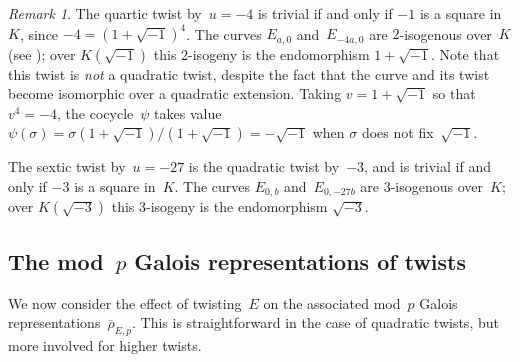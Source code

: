 \documentclass[12pt, reqno]{amsart}
\newcommand{\rhobar}{{\overline{\rho}}}
\numberwithin{equation}{section}
\theoremstyle{definition}
\theoremstyle{remark}
\newtheorem{remark}[theorem]{Remark}
\begin{document}
\begin{remark}\label{R:2-3-isog}
The quartic twist by~$u=-4$ is trivial if and only if $-1$ is a square
in~$K$, since $-4=(1+\sqrt{-1})^4$.  The curves $E_{a,0}$
and~$E_{-4a,0}$ are $2$-isogenous over~$K$ (see
\cite[p.~336]{SilvermanI}); over $K(\sqrt{-1})$ this $2$-isogeny is
the endomorphism $1+\sqrt{-1}$.  Note that this twist is \emph{not} a
quadratic twist, despite the fact that the curve and its twist become
isomorphic over a quadratic extension.  Taking $v=1+\sqrt{-1}$ so that
$v^4=-4$, the cocycle~$\psi$ takes value
$\psi(\sigma)=\sigma(1+\sqrt{-1})/(1+\sqrt{-1})=-\sqrt{-1}$ when
$\sigma$ does not fix~$\sqrt{-1}$.

\begin{comment}
\emph{Sextic twists}, $n=6$: only exist when $j(E)=0$.  The short Weierstrass
model of such a curve has the form~$E_{0,b}$, and its sextic twist
by~$u$ is $E_{0,bu}$.  The sextic twist of~$E$ is isomorphic to~$E$
over~$K(\root6\of u)$, which in general has degree~$6$, but special
cases arise when $u$ is either a square or a cube in~$K$.  When
$u=d^3\in(K^*)^3$, with $d\notin(K^*)^2$, we again obtain the
quadratic twist by~$d$ as a special case of a sextic twist; these are
the sextic twists for which the cocycle takes values in $\{\pm1\}$.
(Unlike the case of $j(E)=1728$ we obtain each quadratic twist exactly
once, since the inflation map $H^1(G_K,\mu_2)\to H^1(G_K,\mu_6)$ is
now injective, as is the cubing map $K^*/(K^*)^2 \to K^*/(K^*)^6$.)
When $u\in(K^*)^2$, the sextic twist by~$u$ may be called a
\emph{cubic twist}; these are sextic twists for which the cocycle
takes values in $\mu_3$, and the curve and its twist become isomorphic
over an extension of~$K$ of degree~$3$.
\end{comment}

The sextic twist by~$u=-27$ is the quadratic twist by~$-3$, and is
trivial if and only if $-3$ is a square in~$K$.  The curves $E_{0,b}$
and~$E_{0,-27b}$ are $3$-isogenous over~$K$; over $K(\sqrt{-3})$ this
$3$-isogeny is the endomorphism $\sqrt{-3}$.
\end{remark}


\subsection{The mod~$p$ Galois representations of twists}\label{SS:GalRepTwist}
We now consider the effect of twisting~$E$ on the associated mod~$p$ Galois
representations~$\rhobar_{E,p}$.
This is straightforward in the case of quadratic
twists, but more involved for higher twists.
\end{document}
